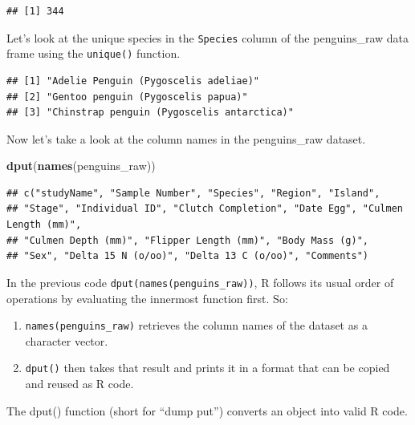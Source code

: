 \documentclass[
]{book}
\newenvironment{Shaded}{\begin{snugshade}}{\end{snugshade}}
\newcommand{\FunctionTok}[1]{\textcolor[rgb]{0.13,0.29,0.53}{\textbf{#1}}}
\newcommand{\NormalTok}[1]{#1}
\newcommand{\SpecialCharTok}[1]{\textcolor[rgb]{0.81,0.36,0.00}{\textbf{#1}}}
\providecommand{\tightlist}{%
  \setlength{\itemsep}{0pt}\setlength{\parskip}{0pt}}
\begin{document}
\begin{verbatim}
## [1] 344
\end{verbatim}

Let's look at the unique species in the \texttt{Species} column of the penguins\_raw data frame using the \texttt{unique()} function.

\begin{Shaded}
\end{Shaded}

\begin{verbatim}
## [1] "Adelie Penguin (Pygoscelis adeliae)"      
## [2] "Gentoo penguin (Pygoscelis papua)"        
## [3] "Chinstrap penguin (Pygoscelis antarctica)"
\end{verbatim}

Now let's take a look at the column names in the penguins\_raw dataset.

\begin{Shaded}
\begin{Highlighting}[]
\FunctionTok{dput}\NormalTok{(}\FunctionTok{names}\NormalTok{(penguins\_raw))}
\end{Highlighting}
\end{Shaded}

\begin{verbatim}
## c("studyName", "Sample Number", "Species", "Region", "Island", 
## "Stage", "Individual ID", "Clutch Completion", "Date Egg", "Culmen Length (mm)", 
## "Culmen Depth (mm)", "Flipper Length (mm)", "Body Mass (g)", 
## "Sex", "Delta 15 N (o/oo)", "Delta 13 C (o/oo)", "Comments")
\end{verbatim}

In the previous code \texttt{dput(names(penguins\_raw))}, R follows its usual order of operations by evaluating the innermost function first. So:

\begin{enumerate}
\def\labelenumi{\arabic{enumi}.}
\tightlist
\item
  \texttt{names(penguins\_raw)} retrieves the column names of the dataset as a character vector.
\item
  \texttt{dput()} then takes that result and prints it in a format that can be copied and reused as R code.
\end{enumerate}

The dput() function (short for ``dump put'') converts an object into valid R code.
\end{document}
